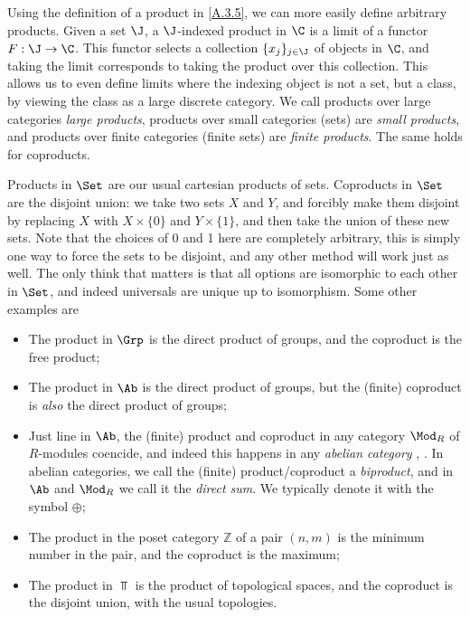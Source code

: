 \begin{remark}\label{A.3.8}
    Using the definition of a product in \cref{A.3.5}, we can more easily define arbitrary products. Given a set $\J$, a $\J$-indexed product in $\C$ is a limit of a functor $F : \J \to \C$. This functor selects a collection $\{x_j\}_{j\in\J}$ of objects in $\C$, and taking the limit corresponds to taking the product over this collection. This allows us to even define limits where the indexing object is not a set, but a class, by viewing the class as a large discrete category. We call products over large categories \emph{large products}, products over small categories (sets) are \emph{small products}, and products over finite categories (finite sets) are \emph{finite products}. The same holds for coproducts.
\end{remark}

\begin{example}\label{A.3.9}
    Products in $\Set$ are our usual cartesian products of sets. Coproducts in $\Set$ are the disjoint union: we take two sets $X$ and $Y$, and forcibly make them disjoint by replacing $X$ with $X\times\{0\}$ and $Y\times\{1\}$, and then take the union of these new sets. Note that the choices of 0 and 1 here are completely arbitrary, this is simply one way to force the sets to be disjoint, and any other method will work just as well. The only think that matters is that all options are isomorphic to each other in $\Set$, and indeed universals are unique up to isomorphism. Some other examples are
    \begin{itemize}
        \item The product in $\Grp$ is the direct product of groups, and the coproduct is the free product;
        \item The product in $\Ab$ is the direct product of groups, but the (finite) coproduct is \emph{also} the direct product of groups;
        \item Just line in $\Ab$, the (finite) product and coproduct in any category $\Mod_R$ of $R$-modules coencide, and indeed this happens in any \emph{abelian category} \cite[VIII.2]{ml}, \cite[IX.1.4]{alg0}. In abelian categories, we call the (finite) product/coproduct a \emph{biproduct}, and in $\Ab$ and $\Mod_R$ we call it the \emph{direct sum}. We typically denote it with the symbol $\oplus$;
        \item The product in the poset category $\mathbb{Z}$ of a pair $(n,m)$ is the minimum number in the pair, and the coproduct is the maximum;
        \item The product in $\Top$ is the product of topological spaces, and the coproduct is the disjoint union, with the usual topologies.
    \end{itemize}
\end{example}

